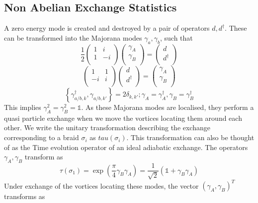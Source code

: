 \documentclass[Master]{subfiles}
\begin{document}
\subsection{Non Abelian Exchange Statistics}\label{sec:ExhcangeStat}
A zero energy mode is created and destroyed by a pair of operators $d,d^{\dag}$. These can be transformed into the Majorana modes $\gamma_{a}, \gamma_{b}$, such that
$$
\frac{1}{2} \left(
\begin{array}{cc}
 1 & i \\
 1 & -i \\
\end{array}
\right) \left(
\begin{array}{c}
 \gamma _{A} \\
 \gamma _{B} \\
\end{array}
\right)=\left(
\begin{array}{c}
 d \\
 d^{\dagger } \\
\end{array}
\right)
$$
$$
\left(
\begin{array}{cc}
 1 & 1 \\
 -i & i \\
\end{array}
\right) \left(
\begin{array}{c}
 d \\
 d^{\dagger } \\
\end{array}
\right)=\left(
\begin{array}{c}
 \gamma _{A} \\
 \gamma _{B} \\
\end{array}
\right)
$$
$$
\left\lbrace
\gamma_{a/b,k}^{\dag},\gamma_{a/b,k'}
\right\rbrace
=2\delta_{k,k'}; \gamma_A = \gamma_A^{\dag},\gamma_B = \gamma_B^{\dag} $$
This implies $\gamma_A^2 = \gamma_B^2 = \mathbb{1}$. As these Majorana modes are localised,
they perform a quasi particle exchange when we move the vortices locating them around each other.
We write the unitary transformation describing the exchange corresponding to a braid $\sigma_i$  as $tau(\sigma_i)$. This transformation can also be thought of as the Time evolution operator of an ideal adiabatic exchange.
The operators $\gamma_A, \gamma_B$ transform as 
$$
\tau(\sigma_1) = \exp \left( \frac{\pi}{4} \gamma_B\gamma_A\right) = \frac{1}{\sqrt{2}} (\mathbb{1} + \gamma_B\gamma_A) 
$$
Under exchange of the vortices locating these modes, the vector $(\gamma_A,\gamma_B)^T$ transforms as \cite{chung2007stability}
\end{document}
